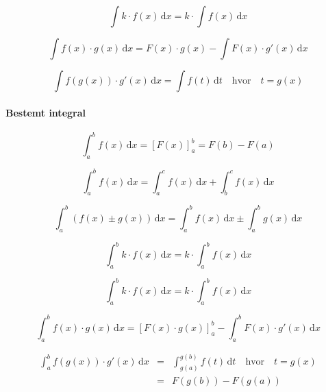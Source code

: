\documentclass[11pt,a5paper,fleqn,leqno]{book}
\begin{document}
\begin{equation}
\int k \cdot f(x)\, \mathrm{d}x = k \cdot \int f(x)\, \mathrm{d}x
\end{equation}

\begin{equation}
\int f(x) \cdot g(x)\, \mathrm{d}x = F(x) \cdot g(x) -  \int F(x) \cdot g'(x)\, \mathrm{d}x
\end{equation}

\begin{equation}
\int f(g(x)) \cdot g'(x)\, \mathrm{d}x = \int f(t)\, \mathrm{d}t \quad \mbox{hvor} \quad t = g(x)
\end{equation}

\paragraph{Bestemt integral}

\begin{equation}
\int_a^b f(x)\, \mathrm{d}x = \left[F(x)\right]_a^b = F(b) - F(a)
\end{equation}

\begin{equation}
\int_a^b f(x)\, \mathrm{d}x = \int_a^c f(x)\, \mathrm{d}x + \int_b^c f(x)\, \mathrm{d}x
\end{equation}

\begin{equation}
\int_a^b \left(f(x) \pm g(x)\right)\, \mathrm{d}x = \int_a^b f(x)\, \mathrm{d}x \pm \int_a^b g(x)\, \mathrm{d}x
\end{equation}

\begin{equation}
\int_a^b k \cdot f(x)\, \mathrm{d}x = k \cdot \int_a^b f(x)\, \mathrm{d}x
\end{equation}

\begin{equation}
\int_a^b k \cdot f(x)\, \mathrm{d}x = k \cdot \int_a^b f(x)\, \mathrm{d}x
\end{equation}

\begin{equation}
\int_a^b f(x) \cdot g(x)\, \mathrm{d}x = \left[F(x) \cdot g(x) \right]_a^b - \int_a^b F(x) \cdot g'(x)\, \mathrm{d}x
\end{equation}

\begin{eqnarray}
\int_a^b f(g(x)) \cdot g'(x)\, \mathrm{d}x & = & \int_{g(a)}^{g(b)} f(t)\, \mathrm{d}t  \quad \mbox{hvor} \quad t = g(x) \\
 & = & F(g(b)) - F(g(a)) \nonumber
\end{eqnarray}
\end{document}
